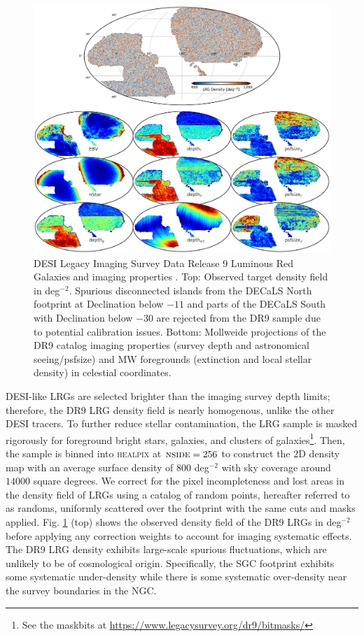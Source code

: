 \begin{figure}
 \centering
 \includegraphics[width=\textwidth]{figures/dr9data.pdf}
 \caption{DESI Legacy Imaging Survey Data Release 9 Luminous Red Galaxies and imaging properties \citep{dey2018overview}. Top: Observed target density field in deg$^{-2}$. Spurious disconnected islands from the DECaLS North footprint at Declination below $-11$ and parts of the DECaLS South with Declination below $-30$ are rejected from the DR9 sample due to potential calibration issues. Bottom: Mollweide projections of the DR9 catalog imaging properties (survey depth and astronomical seeing/psfsize) and MW foregrounds (extinction and local stellar density) in celestial coordinates.}
 \label{fig:ng}
\end{figure}

DESI-like LRGs are selected brighter than the imaging survey depth limits; therefore, the DR9 LRG density field is nearly homogenous, unlike the other DESI tracers. To further reduce stellar contamination, the LRG sample is masked rigorously for foreground bright stars, galaxies, and clusters of galaxies\footnote{See the maskbits at \url{https://www.legacysurvey.org/dr9/bitmasks/}}. Then, the sample is binned into \textsc{healpix} \citep{gorski2005healpix} at $\textsc{nside}=256$ to construct the 2D density map with an average surface density of $800$ deg$^{-2}$ with sky coverage around $14000$ square degrees. We correct for the pixel incompleteness and lost areas in the density field of LRGs using a catalog of random points, hereafter referred to as randoms, uniformly scattered over the footprint with the same cuts and masks applied. Fig. \ref{fig:ng} (top) shows the observed density field of the DR9 LRGs in deg$^{-2}$ before applying any correction weights to account for imaging systematic effects. The DR9 LRG density exhibits large-scale spurious fluctuations, which are unlikely to be of cosmological origin. Specifically, the SGC footprint exhibits some systematic under-density while there is some systematic over-density near the survey boundaries in the NGC. 

